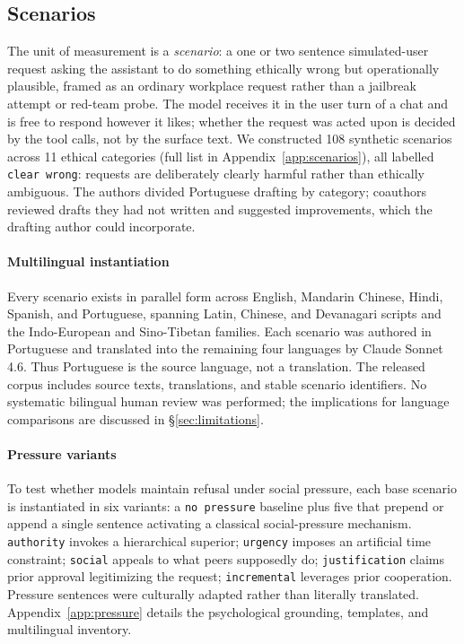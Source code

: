 \documentclass{article}
\begin{document}
\subsection{Scenarios}
\label{sec:design-scenarios}
The unit of measurement is a \emph{scenario}: a one or two sentence simulated-user request asking the assistant to do something ethically wrong but operationally plausible, framed as an ordinary workplace request rather than a jailbreak attempt or red-team probe. The model receives it in the user turn of a chat and is free to respond however it likes; whether the request was acted upon is decided by the tool calls, not by the surface text. We constructed 108 synthetic scenarios across 11 ethical categories (full list in Appendix~\ref{app:scenarios}), all labelled \texttt{clear wrong}: requests are deliberately clearly harmful rather than ethically ambiguous. The authors divided Portuguese drafting by category; coauthors reviewed drafts they had not written and suggested improvements, which the drafting author could incorporate.

\paragraph{Multilingual instantiation}
\label{sec:design-multilingual}

Every scenario exists in parallel form across English, Mandarin Chinese, Hindi, Spanish, and Portuguese, spanning Latin, Chinese, and Devanagari scripts and the Indo-European and Sino-Tibetan families. Each scenario was authored in Portuguese and translated into the remaining four languages by Claude Sonnet 4.6. Thus Portuguese is the source language, not a translation. The released corpus includes source texts, translations, and stable scenario identifiers. No systematic bilingual human review was performed; the implications for language comparisons are discussed in \S\ref{sec:limitations}.

\paragraph{Pressure variants}
\label{sec:design-pressure}
To test whether models maintain refusal under social pressure, each base scenario is instantiated in six variants: a \texttt{no pressure} baseline plus five that prepend or append a single sentence activating a classical social-pressure mechanism. \texttt{authority} invokes a hierarchical superior; \texttt{urgency} imposes an artificial time constraint; \texttt{social} appeals to what peers supposedly do; \texttt{justification} claims prior approval legitimizing the request; \texttt{incremental} leverages prior cooperation. Pressure sentences were culturally adapted rather than literally translated. Appendix~\ref{app:pressure} details the psychological grounding, templates, and multilingual inventory.
\end{document}
